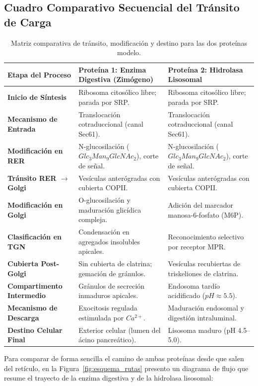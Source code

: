 \documentclass[12pt,spanish,letterpaper,oneside]{article}
\begin{document}
\subsection{Cuadro Comparativo Secuencial del Tránsito de Carga}

\begin{table}[htbp]
\centering
\footnotesize
\begin{tabularx}{\textwidth}{p{3.2cm}ZZ}
\toprule
\textbf{Etapa del Proceso} & \textbf{Proteína 1: Enzima Digestiva (Zimógeno)} & \textbf{Proteína 2: Hidrolasa Lisosomal} \\
\midrule
\textbf{Inicio de Síntesis} & Ribosoma citosólico libre; parada por SRP. & Ribosoma citosólico libre; parada por SRP. \\
\textbf{Mecanismo de Entrada} & Translocación cotraduccional (canal Sec61). & Translocación cotraduccional (canal Sec61). \\
\textbf{Modificación en RER} & N-glucosilación ($Glc_3Man_9GlcNAc_2$), corte de señal. & N-glucosilación ($Glc_3Man_9GlcNAc_2$), corte de señal. \\
\textbf{Tránsito RER $\to$ Golgi} & Vesículas anterógradas con cubierta COPII. & Vesículas anterógradas con cubierta COPII. \\
\textbf{Modificación en Golgi} & O-glucosilación y maduración glicídica compleja. & Adición del marcador manosa-6-fosfato (M6P). \\
\textbf{Clasificación en TGN} & Condensación en agregados insolubles apicales. & Reconocimiento selectivo por receptor MPR. \\
\textbf{Cubierta Post-Golgi} & Sin cubierta de clatrina; gemación de gránulos. & Vesículas recubiertas de triskeliones de clatrina. \\
\textbf{Compartimento Intermedio} & Gránulos de secreción inmaduros apicales. & Endosoma tardío acidificado ($pH \approx 5.5$). \\
\textbf{Mecanismo de Descarga} & Exocitosis regulada estimulada por $Ca^{2+}$. & Maduración endosomal y digestión intraluminal. \\
\textbf{Destino Celular Final} & Exterior celular (lumen del ácino pancreático). & Lisosoma maduro (pH 4.5--5.0). \\
\bottomrule
\end{tabularx}
\caption{Matriz comparativa de tránsito, modificación y destino para las dos proteínas modelo.}
\label{tab:comparativo_rutas}
\end{table}

Para comparar de forma sencilla el camino de ambas proteínas desde que salen del retículo, en la Figura~\ref{fig:esquema_rutas} presento un diagrama de flujo que resume el trayecto de la enzima digestiva y de la hidrolasa lisosomal:
\end{document}
